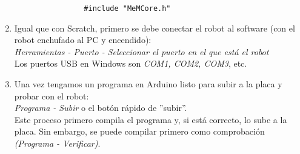 \begin{enumerate}
\begin{verbatim}
				#include "MeMCore.h"	
	\end{verbatim}
	\item Igual que con Scratch, primero se debe conectar el robot al software (con el robot enchufado al PC y encendido):\\
	\textit{Herramientas - Puerto - Seleccionar el puerto en el que está el robot} \\
	Los puertos USB en Windows son \textit{COM1, COM2, COM3}, etc.
	\item  Una vez tengamos un programa en Arduino listo para subir a la placa y probar con el robot:\\
	\textit{Programa - Subir } o el botón rápido de ''subir''. \\
	Este proceso primero compila el programa y, si está correcto, lo sube a la placa. Sin embargo, se puede compilar primero como comprobación \textit{(Programa - Verificar)}.
\end{enumerate}
